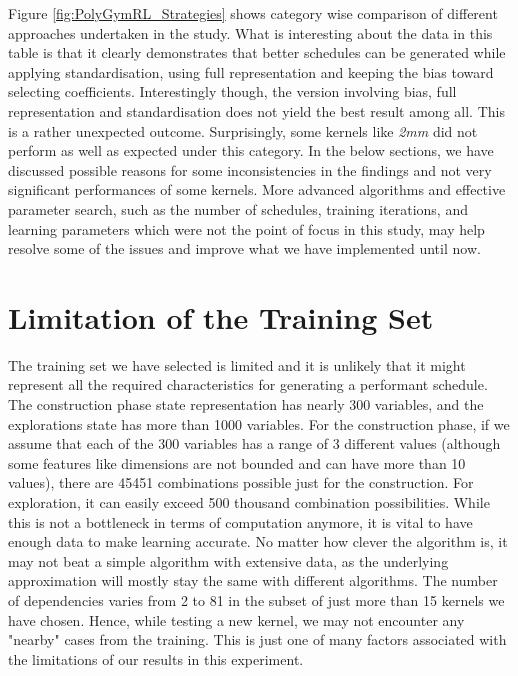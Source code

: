 \documentclass[logo,msc]{infthesis}           %
\begin{document}
Figure \ref{fig:PolyGymRL_Strategies} shows category wise comparison of different approaches undertaken in the study. What is interesting about the data in this table is that it clearly demonstrates that better schedules can be generated while applying standardisation, using full representation and keeping the bias toward selecting coefficients. Interestingly though, the version involving bias, full representation and standardisation does not yield the best result among all. This is a rather unexpected outcome. Surprisingly, some kernels like \textit{2mm} did not perform as well as expected under this category. In the below sections, we have discussed possible reasons for some inconsistencies in the findings and not very significant performances of some kernels. More advanced algorithms and effective parameter search, such as the number of schedules, training iterations, and learning parameters which were not the point of focus in this study, may help resolve some of the issues and improve what we have implemented until now.

\section{Limitation of the Training Set}
The training set we have selected is limited and it is unlikely that it might represent all the required characteristics for generating a performant schedule. The construction phase state representation has nearly 300 variables, and the explorations state has more than 1000 variables. For the construction phase, if we assume that each of the 300 variables has a range of 3 different values (although some features like dimensions are not bounded and can have more than 10 values), there are 45451 combinations possible just for the construction. For exploration, it can easily exceed 500 thousand combination possibilities. While this is not a bottleneck in terms of computation anymore, it is vital to have enough data to make learning accurate. No matter how clever the algorithm is, it may not beat a simple algorithm with extensive data, as the underlying approximation will mostly stay the same with different algorithms. The number of dependencies varies from 2 to 81 in the subset of just more than 15 kernels we have chosen. Hence, while testing a new kernel, we may not encounter any "nearby" cases from the training. This is just one of many factors associated with the limitations of our results in this experiment. 
\end{document}
